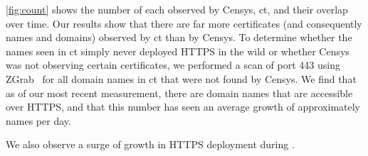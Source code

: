 \autoref{fig:count} shows the number of each observed by Censys, \ac{ct}, and
their overlap over time. Our results show that there are far more certificates
(and consequently names and domains) observed by \ac{ct} than by Censys. To
determine whether the names seen in \ac{ct} simply never deployed HTTPS in the
wild or whether Censys was not observing certain certificates, we performed a
scan of port 443 using ZGrab~\cite{durumeric2015search} for all domain
names in \ac{ct} that were not found by Censys. We find that as of our most
recent measurement, there are  domain names that are accessible over
HTTPS, and that this number has seen an average growth of approximately
 names per day. 

We also observe a surge of growth in HTTPS deployment during .



